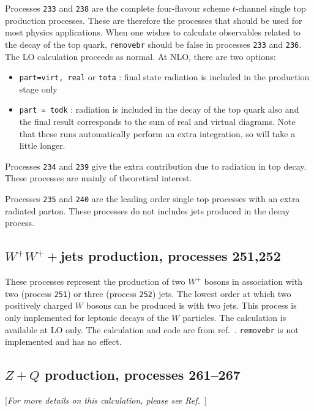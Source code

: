 Processes {\tt 233} and {\tt 238} are the complete four-flavour scheme $t$-channel single top production processes.
These are therefore the processes that should be used for most physics applications.
When one wishes to calculate observables related to the decay of the top
quark, {\tt removebr} should be false in processes {\tt 233} and {\tt 236}.
The LO calculation proceeds as normal. At NLO, there are two options:
\begin{itemize}
\item {\tt part=virt, real} or {\tt tota} : final state radiation is included
in the production stage only
\item {\tt part = todk} : radiation is included in the decay of the top
quark also and the final result corresponds to the sum of real and virtual
diagrams. 
Note that these runs automatically perform an extra integration, so
will take a little longer.
\end{itemize}


Processes {\tt 234} and {\tt 239} give the extra contribution due to radiation 
in top decay. These processes are mainly of theoretical interest. 

Processes {\tt 235} and {\tt 240} are the leading order single top processes with an 
extra radiated parton. These processes do not includes jets produced in the decay process.

\subsection{$W^+W^++$jets production, processes 251,252}
These processes represent the production of two $W^+$ 
bosons in association with two (process {\tt 251}) or three (process {\tt 252})
jets.  The lowest order at which two positively charged $W$ bosons 
can be produced is with two jets. 
This process is only implemented for leptonic decays of the 
$W$ particles. The calculation is available at LO only.
The calculation and code are from ref.~\cite{Melia:2010bm}.
{\tt removebr} is not implemented and has no effect.

\subsection{$Z+Q$ production, processes 261--267}
\label{subsec:ZQ}

\begin{center}
[{\it For more details on this calculation, please see Ref.~\cite{Campbell:2003dd}}]
\end{center}

